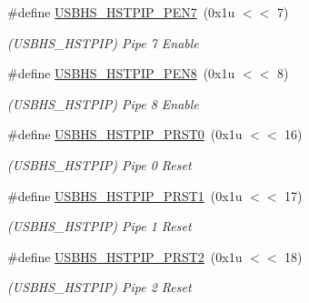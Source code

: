 \begin{DoxyCompactItemize}
\#define \mbox{\hyperlink{group__SAMV71__USBHS_ga25f985d289cb1cfd228ca1829157ce2a}{U\+S\+B\+H\+S\+\_\+\+H\+S\+T\+P\+I\+P\+\_\+\+P\+E\+N7}}~(0x1u $<$$<$ 7)
\begin{DoxyCompactList}\small\item\em (U\+S\+B\+H\+S\+\_\+\+H\+S\+T\+P\+IP) Pipe 7 Enable \end{DoxyCompactList}\item 
\mbox{\label{group__SAMV71__USBHS_ga0202485e22227369e96e2f379b2b22ce}} 
\#define \mbox{\hyperlink{group__SAMV71__USBHS_ga0202485e22227369e96e2f379b2b22ce}{U\+S\+B\+H\+S\+\_\+\+H\+S\+T\+P\+I\+P\+\_\+\+P\+E\+N8}}~(0x1u $<$$<$ 8)
\begin{DoxyCompactList}\small\item\em (U\+S\+B\+H\+S\+\_\+\+H\+S\+T\+P\+IP) Pipe 8 Enable \end{DoxyCompactList}\item 
\mbox{\label{group__SAMV71__USBHS_ga42f2334a1965f0ea164c16c7846a76e1}} 
\#define \mbox{\hyperlink{group__SAMV71__USBHS_ga42f2334a1965f0ea164c16c7846a76e1}{U\+S\+B\+H\+S\+\_\+\+H\+S\+T\+P\+I\+P\+\_\+\+P\+R\+S\+T0}}~(0x1u $<$$<$ 16)
\begin{DoxyCompactList}\small\item\em (U\+S\+B\+H\+S\+\_\+\+H\+S\+T\+P\+IP) Pipe 0 Reset \end{DoxyCompactList}\item 
\mbox{\label{group__SAMV71__USBHS_ga5c4319ddf947a1ff53fd19f6221ba6f9}} 
\#define \mbox{\hyperlink{group__SAMV71__USBHS_ga5c4319ddf947a1ff53fd19f6221ba6f9}{U\+S\+B\+H\+S\+\_\+\+H\+S\+T\+P\+I\+P\+\_\+\+P\+R\+S\+T1}}~(0x1u $<$$<$ 17)
\begin{DoxyCompactList}\small\item\em (U\+S\+B\+H\+S\+\_\+\+H\+S\+T\+P\+IP) Pipe 1 Reset \end{DoxyCompactList}\item 
\mbox{\label{group__SAMV71__USBHS_ga1f8fa4b5f8a83efb290859bac8f771c5}} 
\#define \mbox{\hyperlink{group__SAMV71__USBHS_ga1f8fa4b5f8a83efb290859bac8f771c5}{U\+S\+B\+H\+S\+\_\+\+H\+S\+T\+P\+I\+P\+\_\+\+P\+R\+S\+T2}}~(0x1u $<$$<$ 18)
\begin{DoxyCompactList}\small\item\em (U\+S\+B\+H\+S\+\_\+\+H\+S\+T\+P\+IP) Pipe 2 Reset \end{DoxyCompactList}\item 
$$
\end{DoxyCompactItemize}

